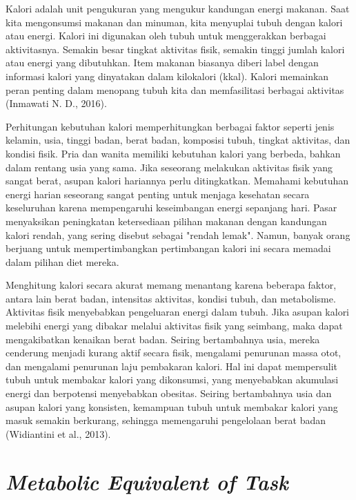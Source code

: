 Kalori adalah unit pengukuran yang mengukur kandungan energi makanan. Saat kita mengonsumsi makanan dan minuman, kita menyuplai tubuh dengan kalori atau energi. Kalori ini digunakan oleh tubuh untuk menggerakkan berbagai aktivitasnya. Semakin besar tingkat aktivitas fisik, semakin tinggi jumlah kalori atau energi yang dibutuhkan. Item makanan biasanya diberi label dengan informasi kalori yang dinyatakan dalam kilokalori (kkal). Kalori memainkan peran penting dalam menopang tubuh kita dan memfasilitasi berbagai aktivitas (Inmawati N. D., 2016).

Perhitungan kebutuhan kalori memperhitungkan berbagai faktor seperti jenis kelamin, usia, tinggi badan, berat badan, komposisi tubuh, tingkat aktivitas, dan kondisi fisik. Pria dan wanita memiliki kebutuhan kalori yang berbeda, bahkan dalam rentang usia yang sama. Jika seseorang melakukan aktivitas fisik yang sangat berat, asupan kalori hariannya perlu ditingkatkan. Memahami kebutuhan energi harian seseorang sangat penting untuk menjaga kesehatan secara keseluruhan karena mempengaruhi keseimbangan energi sepanjang hari. Pasar menyaksikan peningkatan ketersediaan pilihan makanan dengan kandungan kalori rendah, yang sering disebut sebagai "rendah lemak". Namun, banyak orang berjuang untuk mempertimbangkan pertimbangan kalori ini secara memadai dalam pilihan diet mereka.

Menghitung kalori secara akurat memang menantang karena beberapa faktor, antara lain berat badan, intensitas aktivitas, kondisi tubuh, dan metabolisme. Aktivitas fisik menyebabkan pengeluaran energi dalam tubuh. Jika asupan kalori melebihi energi yang dibakar melalui aktivitas fisik yang seimbang, maka dapat mengakibatkan kenaikan berat badan. Seiring bertambahnya usia, mereka cenderung menjadi kurang aktif secara fisik, mengalami penurunan massa otot, dan mengalami penurunan laju pembakaran kalori. Hal ini dapat mempersulit tubuh untuk membakar kalori yang dikonsumsi, yang menyebabkan akumulasi energi dan berpotensi menyebabkan obesitas. Seiring bertambahnya usia dan asupan kalori yang konsisten, kemampuan tubuh untuk membakar kalori yang masuk semakin berkurang, sehingga memengaruhi pengelolaan berat badan (Widiantini et al., 2013).

\section{\emph{Metabolic Equivalent of Task}}
\label{sec:met}

